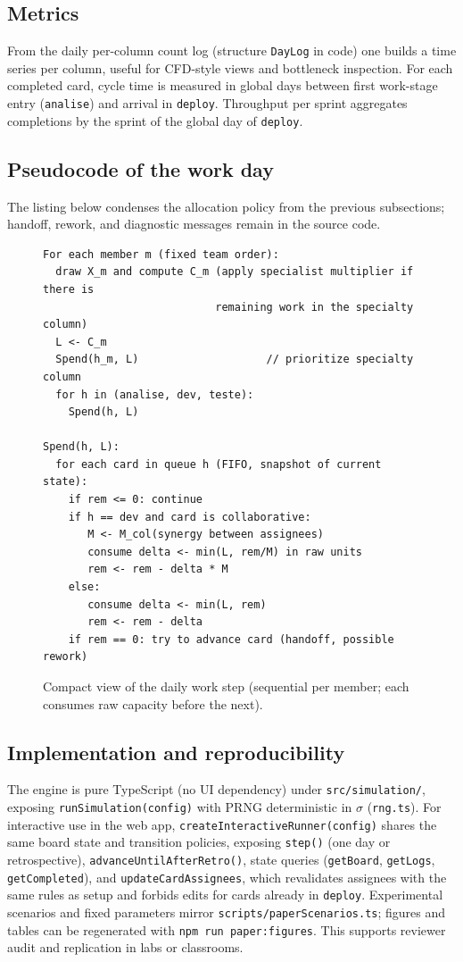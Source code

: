 \subsection{Metrics}
From the daily per-column count log (structure \texttt{DayLog} in code) one builds a time series per column, useful for CFD-style views and bottleneck inspection. For each completed card, cycle time is measured in global days between first work-stage entry (\texttt{analise}) and arrival in \texttt{deploy}. Throughput per sprint aggregates completions by the sprint of the global day of \texttt{deploy}.

\subsection{Pseudocode of the work day}
The listing below condenses the allocation policy from the previous subsections; handoff, rework, and diagnostic messages remain in the source code.

\begin{figure}[htbp]
  \centering
  \begin{minipage}{0.92\linewidth}
  \small
  \begin{verbatim}
For each member m (fixed team order):
  draw X_m and compute C_m (apply specialist multiplier if there is
                           remaining work in the specialty column)
  L <- C_m
  Spend(h_m, L)                    // prioritize specialty column
  for h in (analise, dev, teste):
    Spend(h, L)

Spend(h, L):
  for each card in queue h (FIFO, snapshot of current state):
    if rem <= 0: continue
    if h == dev and card is collaborative:
       M <- M_col(synergy between assignees)
       consume delta <- min(L, rem/M) in raw units
       rem <- rem - delta * M
    else:
       consume delta <- min(L, rem)
       rem <- rem - delta
    if rem == 0: try to advance card (handoff, possible rework)
\end{verbatim}
  \end{minipage}
  \caption{Compact view of the daily work step (sequential per member; each consumes raw capacity before the next).}
  \label{fig:pseudo}
\end{figure}

\subsection{Implementation and reproducibility}
The engine is pure TypeScript (no UI dependency) under \texttt{src/simulation/}, exposing \texttt{runSimulation(config)} with PRNG deterministic in $\sigma$ (\texttt{rng.ts}). For interactive use in the web app, \texttt{createInteractiveRunner(config)} shares the same board state and transition policies, exposing \texttt{step()} (one day or retrospective), \texttt{advanceUntilAfterRetro()}, state queries (\texttt{getBoard}, \texttt{getLogs}, \texttt{getCompleted}), and \texttt{updateCardAssignees}, which revalidates assignees with the same rules as setup and forbids edits for cards already in \texttt{deploy}. Experimental scenarios and fixed parameters mirror \texttt{scripts/paperScenarios.ts}; figures and tables can be regenerated with \texttt{npm run paper:figures}. This supports reviewer audit and replication in labs or classrooms.
